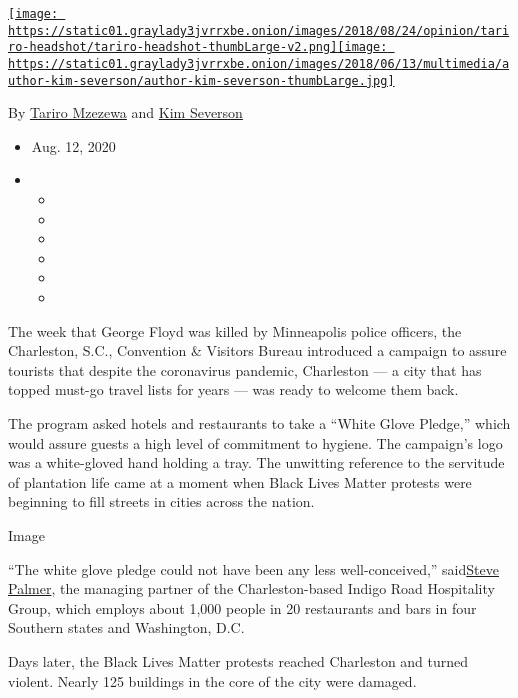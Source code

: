 \href{https://www.nytimes3xbfgragh.onion/by/tariro-mzezewa}{\texttt{[image: https://static01.graylady3jvrrxbe.onion/images/2018/08/24/opinion/tariro-headshot/tariro-headshot-thumbLarge-v2.png]}}\href{https://www.nytimes3xbfgragh.onion/by/kim-severson}{\texttt{[image: https://static01.graylady3jvrrxbe.onion/images/2018/06/13/multimedia/author-kim-severson/author-kim-severson-thumbLarge.jpg]}}

By \href{https://www.nytimes3xbfgragh.onion/by/tariro-mzezewa}{Tariro
Mzezewa} and
\href{https://www.nytimes3xbfgragh.onion/by/kim-severson}{Kim Severson}

\begin{itemize}
\item
  Aug. 12, 2020
\item
  \begin{itemize}
  \item
  \item
  \item
  \item
  \item
  \item
  \end{itemize}
\end{itemize}

The week that George Floyd was killed by Minneapolis police officers,
the Charleston, S.C., Convention \& Visitors Bureau introduced a
campaign to assure tourists that despite the coronavirus pandemic,
Charleston --- a city that has topped must-go travel lists for years ---
was ready to welcome them back.

The program asked hotels and restaurants to take a ``White Glove
Pledge,'' which would assure guests a high level of commitment to
hygiene. The campaign's logo was a white-gloved hand holding a tray. The
unwitting reference to the servitude of plantation life came at a moment
when Black Lives Matter protests were beginning to fill streets in
cities across the nation.

Image

``The white glove pledge could not have been any less well-conceived,''
said\href{https://www.nytimes3xbfgragh.onion/2019/10/31/dining/steve-palmer-restaurant-addiction.html}{Steve
Palmer}, the managing partner of the Charleston-based Indigo Road
Hospitality Group, which employs about 1,000 people in 20 restaurants
and bars in four Southern states and Washington, D.C.

Days later, the Black Lives Matter protests reached Charleston and
turned violent. Nearly 125 buildings in the core of the city were
damaged.

